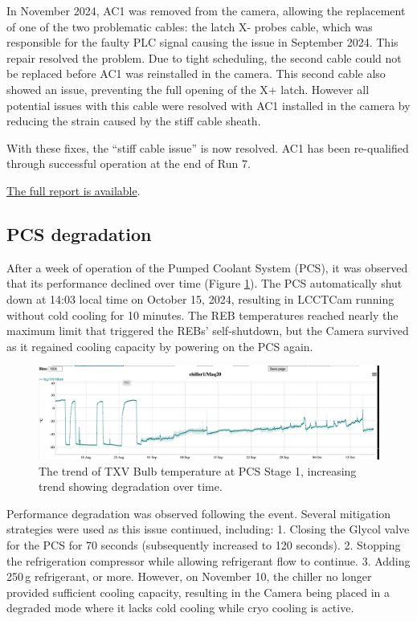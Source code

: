 In November 2024, AC1 was removed from the camera, allowing the replacement of one of the two problematic cables: the latch X- probes cable, which was responsible for the faulty PLC signal causing the issue in September 2024. This repair resolved the problem. Due to tight scheduling, the second cable could not be replaced before AC1 was reinstalled in the camera. This second cable also showed an issue, preventing the full opening of the X+ latch. However all potential  issues with this cable were resolved with AC1 installed in the camera by reducing the strain caused by the stiff cable sheath.

With these fixes, the “stiff cable issue” is now resolved. AC1 has been re-qualified through successful operation at the end of Run 7.

\href{https://rubinobs.atlassian.net/browse/FRACAS-241}{The full report is available}.

\clearpage
\subsection{PCS degradation}\label{sec:pcsdegradation}
After a week of operation of the Pumped Coolant System (PCS), it was observed that its performance declined over time (Figure \ref{fig:pcsdegradation}). The PCS automatically shut down at 14:03 local time on October 15, 2024, resulting in LCCTCam running without cold cooling for 10 minutes. The REB temperatures reached nearly the maximum limit that triggered the REBs' self-shutdown, but the Camera survived as it regained cooling capacity by powering on the PCS again.
\begin{figure}[ht]
    \centering
    \includegraphics[width=1\linewidth]{figures//Issues/PCSTXVBulbAug11toOct17.png}
    \caption{The trend of TXV Bulb temperature at PCS Stage 1, increasing trend showing degradation over time.}
    \label{fig:pcsdegradation}
\end{figure}

Performance degradation was observed following the event. Several mitigation strategies were used as this issue continued, including:
1. Closing the Glycol valve for the PCS for 70 seconds (subsequently increased to 120 seconds).
2. Stopping the refrigeration compressor while allowing refrigerant flow to continue.
3. Adding 250\,g refrigerant, or more.
However, on November 10, the chiller no longer provided sufficient cooling capacity, resulting in the Camera being placed in a degraded mode where it lacks cold cooling while cryo cooling is active.

